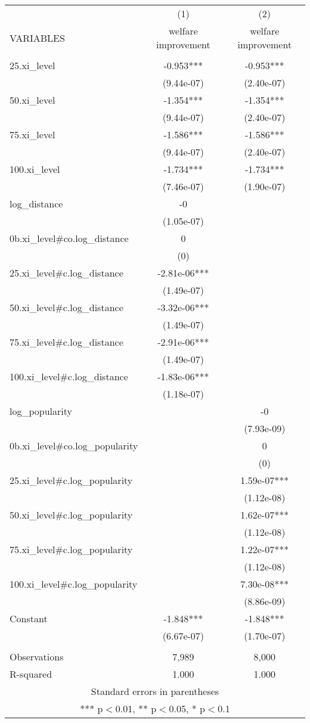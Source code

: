 

\begin{tabular}{lcc} \hline
 & (1) & (2) \\
VARIABLES & welfare improvement & welfare improvement \\ \hline
 &  &  \\
25.xi\_level & -0.953*** & -0.953*** \\
 & (9.44e-07) & (2.40e-07) \\
50.xi\_level & -1.354*** & -1.354*** \\
 & (9.44e-07) & (2.40e-07) \\
75.xi\_level & -1.586*** & -1.586*** \\
 & (9.44e-07) & (2.40e-07) \\
100.xi\_level & -1.734*** & -1.734*** \\
 & (7.46e-07) & (1.90e-07) \\
log\_distance & -0 &  \\
 & (1.05e-07) &  \\
0b.xi\_level\#co.log\_distance & 0 &  \\
 & (0) &  \\
25.xi\_level\#c.log\_distance & -2.81e-06*** &  \\
 & (1.49e-07) &  \\
50.xi\_level\#c.log\_distance & -3.32e-06*** &  \\
 & (1.49e-07) &  \\
75.xi\_level\#c.log\_distance & -2.91e-06*** &  \\
 & (1.49e-07) &  \\
100.xi\_level\#c.log\_distance & -1.83e-06*** &  \\
 & (1.18e-07) &  \\
log\_popularity &  & -0 \\
 &  & (7.93e-09) \\
0b.xi\_level\#co.log\_popularity &  & 0 \\
 &  & (0) \\
25.xi\_level\#c.log\_popularity &  & 1.59e-07*** \\
 &  & (1.12e-08) \\
50.xi\_level\#c.log\_popularity &  & 1.62e-07*** \\
 &  & (1.12e-08) \\
75.xi\_level\#c.log\_popularity &  & 1.22e-07*** \\
 &  & (1.12e-08) \\
100.xi\_level\#c.log\_popularity &  & 7.30e-08*** \\
 &  & (8.86e-09) \\
Constant & -1.848*** & -1.848*** \\
 & (6.67e-07) & (1.70e-07) \\
 &  &  \\
Observations & 7,989 & 8,000 \\
 R-squared & 1.000 & 1.000 \\ \hline
\multicolumn{3}{c}{ Standard errors in parentheses} \\
\multicolumn{3}{c}{ *** p$<$0.01, ** p$<$0.05, * p$<$0.1} \\
\end{tabular}

